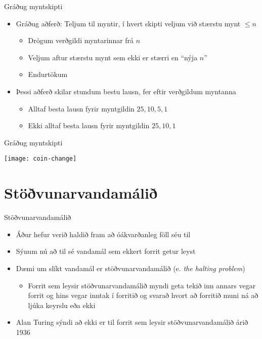 \documentclass[handout]{beamer}
\begin{document}
\begin{frame}{Gráðug myntskipti}
\begin{itemize}
 \item Gráðug aðferð: Teljum til myntir, í hvert skipti veljum við stærstu mynt $\leq n$
 \begin{itemize}
  \item Drögum verðgildi myntarinnar frá $n$
  \item Veljum aftur stærstu mynt sem ekki er stærri en ``nýja $n$''
  \item Endurtökum
 \end{itemize}
 \item Þessi aðferð skilar stundum bestu lausn, fer eftir verðgildum myntanna
 \begin{itemize}
  \item Alltaf besta lausn fyrir myntgildin $25, 10, 5, 1$
  \item Ekki alltaf besta lausn fyrir myntgildin $25, 10, 1$
 \end{itemize}
\end{itemize}
\end{frame}

\begin{frame}{Gráðug myntskipti}
\begin{center}
\texttt{[image: coin-change]}
\end{center}
\end{frame}

\section{Stöðvunarvandamálið}

\begin{frame}{Stöðvunarvandamálið}
\begin{itemize}
 \item Áður hefur verið haldið fram að óákvarðanleg föll séu til
 \item Sýnum nú að til sé vandamál sem ekkert forrit getur leyst
 \item Dæmi um slíkt vandamál er stöðvunarvandamálið (e. \emph{the halting problem})
 \begin{itemize}
  \item Forrit sem leysir stöðvunarvandamálið myndi geta tekið inn annars vegar forrit og hins vegar inntak í forritið og svarað hvort að forritið muni ná að ljúka keyrslu eða ekki 
 \end{itemize}
 \item Alan Turing sýndi að ekki er til forrit sem leysir stöðvunarvandamálið árið 1936
\end{itemize}
\end{frame}
\end{document}
